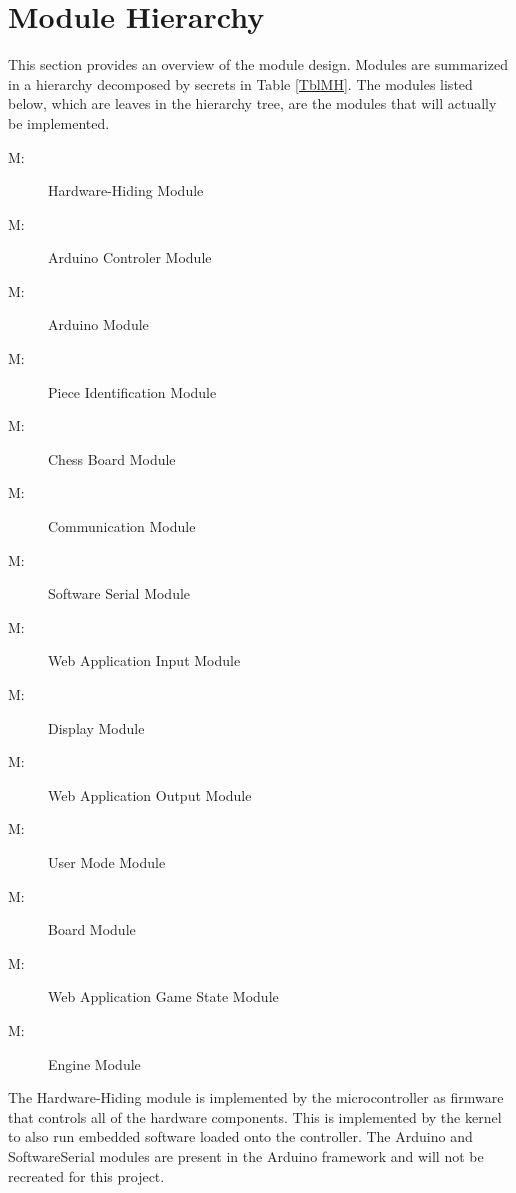 \documentclass[12pt, titlepage]{article}
\newcounter{mnum}
\newcommand{\mthemnum}{M\themnum}
\begin{document}
\section{Module Hierarchy} \label{SecMH}

This section provides an overview of the module design. Modules are summarized
in a hierarchy decomposed by secrets in Table \ref{TblMH}. The modules listed
below, which are leaves in the hierarchy tree, are the modules that will
actually be implemented.

\begin{description}
\item [ \mthemnum \label{mHH}:] Hardware-Hiding Module
\item [ \mthemnum \label{mAC}:] Arduino Controler Module
\item [ \mthemnum \label{mAM}:] Arduino Module
\item [ \mthemnum \label{mPI}:] Piece Identification Module
\item [ \mthemnum \label{mCB}:] Chess Board Module
\item [ \mthemnum \label{mCM}:] Communication Module
\item [ \mthemnum \label{mSS}:] Software Serial Module
\item [ \mthemnum \label{mInput}:] Web Application Input Module
\item [ \mthemnum \label{mDisplay}:] Display Module
\item [ \mthemnum \label{mOutput}:] Web Application Output Module
\item [ \mthemnum \label{mMode}:] User Mode Module
\item [ \mthemnum \label{mBoard}:] Board Module
\item [ \mthemnum \label{mGame}:] Web Application Game State Module
\item [ \mthemnum \label{mEngine}:] Engine Module
\end{description}

The Hardware-Hiding module is implemented by the microcontroller as firmware that controls all of the hardware components. This is implemented by the kernel to also run embedded software loaded onto the controller. The Arduino and SoftwareSerial modules are present in the Arduino framework and will not be recreated for this project.
\end{document}
